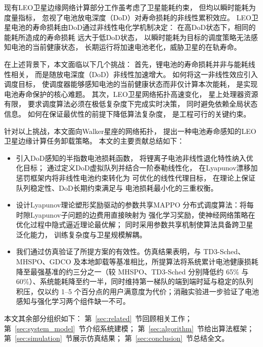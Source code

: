 \documentclass[a4paper,11pt]{article}
\begin{document}
现有LEO卫星边缘网络计算部分工作虽考虑了卫星能耗约束，
但均以瞬时能耗为度量指标\cite{3}，
忽视了电池放电深度（DoD）对寿命损耗的非线性累积效应。
LEO卫星电池的寿命损耗由DoD通过非线性电化学机制决定：
在高DoD状态下，相同的能耗所造成的寿命损耗
远大于低DoD状态\cite{4}，
以瞬时能耗为目标的调度策略无法感知电池的当前健康状态，
长期运行将加速电池老化，威胁卫星的在轨寿命\cite{5}。

在上述背景下，本文面临以下几个挑战：
首先，锂电池的寿命损耗并非与能耗线性相关，
而是随放电深度（DoD）非线性加速增大。
如何将这一非线性效应引入调度目标，
使调度器能够感知电池的当前健康状态而非仅计算本次能耗，
是实现电池寿命保护的核心难题。
其次，LEO卫星网络拓扑高速变化，
星上处理器资源有限，
要求调度算法必须在极低复杂度下完成实时决策，
同时避免依赖全局状态信息。
如何在保证最优性的前提下降低算法复杂度，
是工程可行的关键约束。

针对以上挑战，本文面向Walker星座的网络拓扑，
提出一种电池寿命感知的LEO卫星边缘计算任务卸载策略。
本文的主要贡献总结如下：
\begin{itemize}
    \item 引入DoD感知的半指数电池损耗函数，
    将锂离子电池非线性退化特性纳入优化目标；
    通过定义DoD虚拟队列并结合一阶泰勒线性化，
    在Lyapunov漂移加惩罚框架内将非线性电池约束转化为
    可优化的线性代理目标，
    在理论上保证队列稳定性、DoD长期约束满足与
    电池损耗最小化的三重权衡。

    \item 设计Lyapunov理论塑形奖励驱动的参数共享MAPPO
    分布式调度算法：将每时隙Lyapunov子问题的边费用直接映射为
    强化学习奖励，使神经网络策略在优化过程中隐式逼近理论最优解；
    同时采用参数共享机制使算法具备跨卫星泛化能力，
    训练复杂度与卫星规模解耦。

    \item 我们通过仿真验证了所提方案的有效性。仿真结果表明，与 TD3-Sched、MHSPO、GDCO 及本地卸载等基准相比，所提算法将系统累计电池健康损耗降至最强基准的约三分之一（较 MHSPO、TD3-Sched 分别降低约 65\% 与 60\%）、系统能耗降至约一半，同时维持第一梯队的端到端时延与稳定的队列积压，仅以约 1--5 个百分点的用户满意度为代价；消融实验进一步验证了电池感知与强化学习两个组件缺一不可。
\end{itemize}

本文其余部分组织如下：
第~\ref{sec:related}~节回顾相关工作；
第~\ref{sec:system_model}~节介绍系统建模；
第~\ref{sec:algorithm}~节给出算法框架；
第~\ref{sec:simulation}~节展示仿真结果；
第~\ref{sec:conclusion}~节总结全文。
\end{document}
